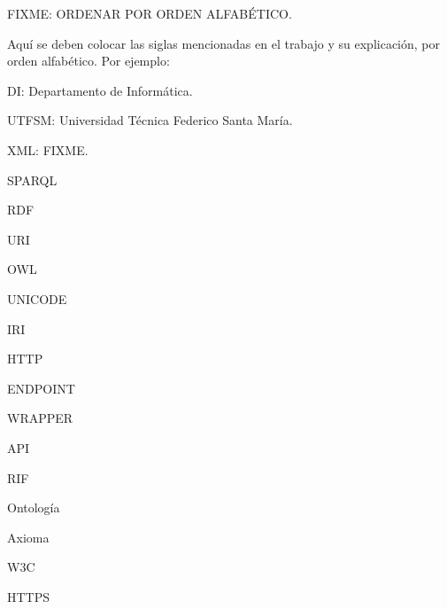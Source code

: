 
FIXME: ORDENAR POR ORDEN ALFABÉTICO.

Aquí se deben colocar las siglas mencionadas en el trabajo y su explicación, por orden alfabético. Por ejemplo: \\

{\setlength{\parskip}{0cm} %
DI: Departamento de Informática.

UTFSM: Universidad Técnica Federico Santa María.

XML: FIXME.

SPARQL

RDF

URI

OWL

UNICODE

IRI

HTTP

ENDPOINT

WRAPPER

API

RIF

Ontología

Axioma

W3C

HTTPS

}
